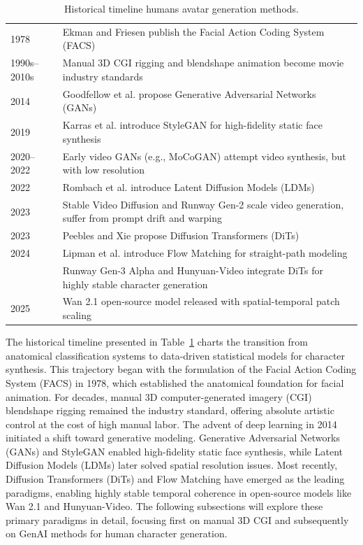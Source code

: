 \documentclass[pdflatex,sn-mathphys-num]{sn-jnl}
\newcommand{\foo}{\hspace{1em}}
\theoremstyle{thmstyleone}
\theoremstyle{thmstyletwo}
\theoremstyle{thmstylethree}
\begin{document}
\begin{table}[ht]
\caption{Historical timeline humans avatar generation methods.}\label{tab:evolution_timeline}
\begin{tabular}{l | @{\foo} p{10.5cm}}
    1978 & Ekman and Friesen publish the Facial Action Coding System (FACS)~\cite{ekman1978facial} \\
    1990s--2010s & Manual 3D CGI rigging and blendshape animation become movie industry standards \\
    2014 & Goodfellow et al. propose Generative Adversarial Networks (GANs)~\cite{goodfellow2014generative} \\
    2019 & Karras et al. introduce StyleGAN for high-fidelity static face synthesis~\cite{karras2019style} \\
    2020--2022 & Early video GANs (e.g., MoCoGAN) attempt video synthesis, but with low resolution  \\
    2022 & Rombach et al. introduce Latent Diffusion Models (LDMs)~\cite{rombach2022high} \\
    2023 & Stable Video Diffusion and Runway Gen-2 scale video generation, suffer from prompt drift and warping \\
    2023 & Peebles and Xie propose Diffusion Transformers (DiTs)~\cite{peebles2023scalable} \\
    2024 & Lipman et al. introduce Flow Matching for straight-path modeling~\cite{lipman2022flow} \\
         & Runway Gen-3 Alpha and Hunyuan-Video integrate DiTs for highly stable character generation~\cite{hunyuan2024video,runway2024gen3} \\
    2025 & Wan 2.1 open-source model released with spatial-temporal patch scaling~\cite{wan2025wan21} \\
\end{tabular}
\end{table}

The historical timeline presented in Table~\ref{tab:evolution_timeline} charts the transition from anatomical classification systems to data-driven statistical models for character synthesis. This trajectory began with the formulation of the Facial Action Coding System (FACS) in 1978, which established the anatomical foundation for facial animation. For decades, manual 3D computer-generated imagery (CGI) blendshape rigging remained the industry standard, offering absolute artistic control at the cost of high manual labor. The advent of deep learning in 2014 initiated a shift toward generative modeling. Generative Adversarial Networks (GANs) and StyleGAN enabled high-fidelity static face synthesis, while Latent Diffusion Models (LDMs) later solved spatial resolution issues. Most recently, Diffusion Transformers (DiTs) and Flow Matching have emerged as the leading paradigms, enabling highly stable temporal coherence in open-source models like Wan 2.1 and Hunyuan-Video. The following subsections will explore these primary paradigms in detail, focusing first on manual 3D CGI and subsequently on GenAI methods for human character generation.
\end{document}
